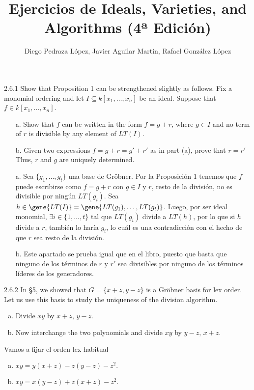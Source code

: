 \documentclass[twoside]{article}
\begin{document}
\title{Ejercicios de Ideals, Varieties, and Algorithms (4ª Edición)}
\author{Diego Pedraza López, Javier Aguilar Martín, Rafael González López}
\maketitle

\begin{ejercicio}{2.6.1}
Show that Proposition 1 can be strengthened slightly as follows. Fix a monomial ordering
and let $I ⊆ k[x_1,\dots , x_n]$ be an ideal. Suppose that $f ∈ k[x_1,\dots , x_n]$.
\begin{enumerate}
\item[a.] Show that $f$ can be written in the form $f = g + r$, where $g ∈ I$ and no term of $r$ is
divisible by any element of $LT(I)$.
\item[b.] Given two expressions $f = g + r = g'
+ r'$ as in part (a), prove that $r = r'$ Thus, $r$
and $g$ are uniquely determined.
\end{enumerate}
\end{ejercicio}

\begin{solucion}
\begin{enumerate}
\item[]
\item[a.] Sea $\{g_1,\dotsc,g_t\}$ una base de Gröbner. Por la Proposición 1 tenemos que $f$ puede escribirse como $f=g+r$ con $g\in I$ y $r$, resto de la división, no es divisible por ningún $LT(g_i)$. Sea $h\in \gene{LT(I)}=\gene{LT(g_1),\dotsc,LT(g_t)}$. Luego, por ser ideal monomial, $\exists i \in\{1,\dotsc,t\}$ tal que $LT(g_i)$ divide a $LT(h)$, por lo que si $h$ divide a $r$, también lo haría $g_i$, lo cuál es una contradicción con el hecho de que $r$ sea resto de la división. 

\item[b.] Este apartado se prueba igual que en el libro, puesto que basta que ninguno de los términos de $r$ y $r'$ sea divisibles por ninguno de los términos líderes de los generadores.
\end{enumerate}
\end{solucion}

\newpage

\begin{ejercicio}{2.6.2}
In §5, we showed that $G = \{x + z, y − z\}$ is a Gröbner basis for lex order. Let us use
this basis to study the uniqueness of the division algorithm.
\begin{enumerate}[a.]
\item Divide $xy$ by $x + z$, $y − z$.
\item Now interchange the two polynomials and divide $xy$ by $y − z$, $x + z$.
\end{enumerate}
\end{ejercicio}
\begin{solucion}
Vamos a fijar el orden lex habitual
\begin{enumerate}[a.]
\item $xy=y(x+z)-z(y-z)-z^2.$
\item $xy=x(y-z)+z(x+z)-z^2.$
\end{enumerate}
\end{solucion}
\newpage
\end{document}
